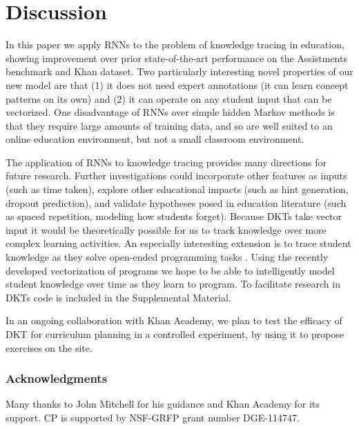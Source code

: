 \documentclass{article} \usepackage{nips,times}
\begin{document}
\section{Discussion}

In this paper we apply RNNs to the problem of knowledge tracing in education, showing improvement over prior state-of-the-art performance on the Assistments benchmark and Khan dataset.
Two particularly interesting novel properties of our new model are that (1) it does not need expert annotations (it can learn concept patterns on its own) and (2) it can operate on any student input that can be vectorized. One disadvantage of RNNs over simple hidden Markov methods is that they require large amounts of training data, and so are well suited to an online education environment, but not a small classroom environment. 

The application of RNNs to knowledge tracing provides many directions for future research. Further investigations could incorporate other features as inputs (such as time taken), explore other educational impacts (such as hint generation, dropout prediction), and validate hypotheses posed in education literature (such as spaced repetition, modeling how students forget).
Because DKTs take vector input it would be theoretically possible for us to track knowledge over more complex learning activities.
An especially interesting extension is to trace student knowledge as they solve open-ended programming tasks \cite{piech2015autonomously,piech2012modeling}.
Using the recently developed vectorization of programs \cite{piechICML15} we hope to be able to intelligently model student knowledge over time as they learn to program.  To facilitate research in DKTs code is included in the Supplemental Material. 

In an ongoing collaboration with Khan Academy, we plan to test the efficacy of DKT for curriculum planning in a controlled experiment, by using it to propose exercises on the site. 

\vspace{-1mm}
 \subsubsection*{Acknowledgments}
 \vspace{-1mm}

Many thanks to John Mitchell for his guidance and Khan Academy for its support. CP is supported by NSF-GRFP grant number DGE-114747.
\vspace{-1mm}
\end{document}
